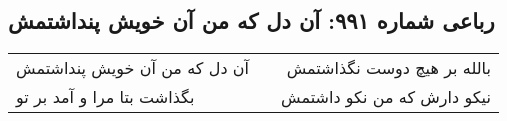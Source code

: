 \begin{center}
\section*{رباعی شماره ۹۹۱: آن دل که من آن خویش پنداشتمش}
\label{sec:0991}
\begin{longtable}{l p{0.5cm} r}
آن دل که من آن خویش پنداشتمش
&&
بالله بر هیچ دوست نگذاشتمش
\\
بگذاشت بتا مرا و آمد بر تو
&&
نیکو دارش که من نکو داشتمش
\\
\end{longtable}
\end{center}
